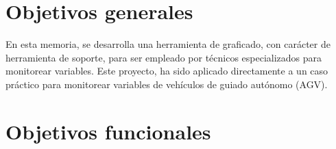 
\section{Objetivos generales}

En esta memoria, se desarrolla una herramienta de graficado, con carácter de herramienta de soporte, para ser empleado por técnicos especializados para monitorear variables. Este proyecto, ha sido aplicado directamente a un caso práctico para monitorear variables de vehículos de guiado autónomo (AGV).

\section{Objetivos funcionales}

